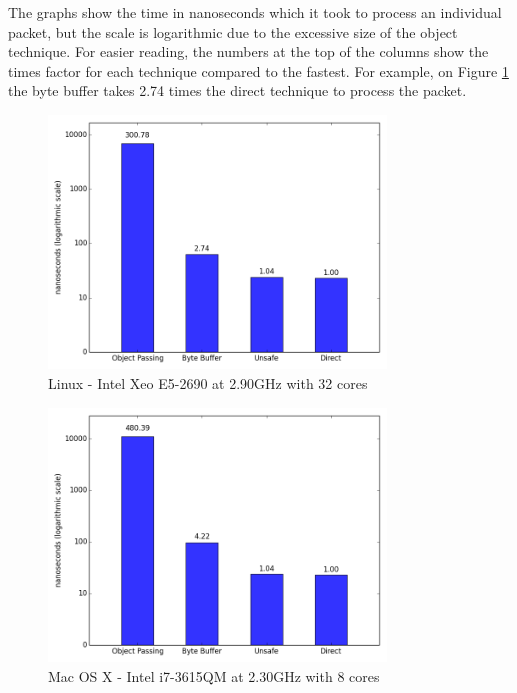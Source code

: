 \documentclass[final_report.tex]{subfiles}
\begin{document}
The graphs show the time in nanoseconds which it took to process an individual packet, but the scale is logarithmic due to the excessive size of the object technique. For easier reading, the numbers at the top of the columns show the times factor for each technique compared to the fastest. For example, on Figure \ref{fig:res1} the byte buffer takes 2.74 times the direct technique to process the packet.

\begin{figure}[H]
	\centering
	\includegraphics[width=0.8\textwidth]{img/server.png}
	\caption{Linux - Intel Xeo E5-2690 at 2.90GHz with 32 cores}
	\label{fig:res1}
\end{figure}

\begin{figure}[H]
	\centering
	\includegraphics[width=0.8\textwidth]{img/mac.png}
	\caption{Mac OS X - Intel i7-3615QM at 2.30GHz with 8 cores}
	\label{fig:res2}
\end{figure}
\end{document}
